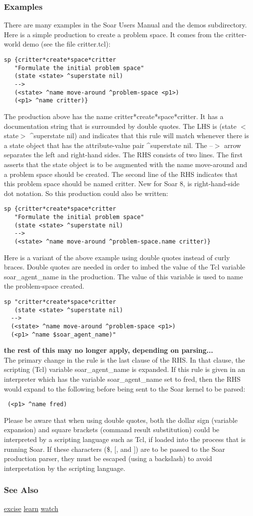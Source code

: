 \subsubsection*{Examples}
 There are many examples in the Soar Users Manual and the demos subdirectory. Here is a simple production to create a problem space. It comes from the critter-world demo (see the file critter.tcl): \begin{verbatim}
sp {critter*create*space*critter
   "Formulate the initial problem space"
   (state <state> ^superstate nil)
   -->
   (<state> ^name move-around ^problem-space <p1>)
   (<p1> ^name critter)}
\end{verbatim}
 The production above has the name critter*create*space*critter. It has a documentation string that is surrounded by double quotes. The LHS is (state $<$state$>$ \^{}superstate nil) and indicates that this rule will match whenever there is a state object that has the attribute-value pair \^{}superstate nil. The --$>$ arrow separates the left and right-hand sides. The RHS consists of two lines. The first asserts that the state object is to be augmented with the name move-around and a problem space should be created. The second line of the RHS indicates that this problem space should be named critter. 
  New for Soar 8, is right-hand-side dot notation. So this production could also be written: \begin{verbatim}
sp {critter*create*space*critter
   "Formulate the initial problem space"
   (state <state> ^superstate nil)
   -->
   (<state> ^name move-around ^problem-space.name critter)}
\end{verbatim}
 Here is a variant of the above example using double quotes instead of curly braces. Double quotes are needed in order to imbed the value of the Tcl variable soar\_agent\_name in the production. The value of this variable is used to name the problem-space created. \begin{verbatim}
sp "critter*create*space*critter
   (state <state> ^superstate nil)
  -->
  (<state> ^name move-around ^problem-space <p1>)
  (<p1> ^name $soar_agent_name)"
\end{verbatim}
 \textbf{ the rest of this may no longer apply, depending on parsing...}
\\ 
 The primary change in the rule is the last clause of the RHS. In that clause, the scripting (Tcl) variable soar\_agent\_name is expanded. If this rule is given in an interpreter which has the variable soar\_agent\_name set to fred, then the RHS would expand to the following before being sent to the Soar kernel to be parsed: \begin{verbatim}
 (<p1> ^name fred)
\end{verbatim}
 Please be aware that when using double quotes, both the dollar sign (variable expansion) and square brackets (command result substitution) could be interpreted by a scripting language such as Tcl, if loaded into the process that is running Soar. If these characters (\$, [, and ]) are to be passed to the Soar production parser, they must be escaped (using a backslash) to avoid interpretation by the scripting language. 
\subsubsection*{See Also}
\hyperref[excise]{excise} \hyperref[learn]{learn} \hyperref[watch]{watch} 